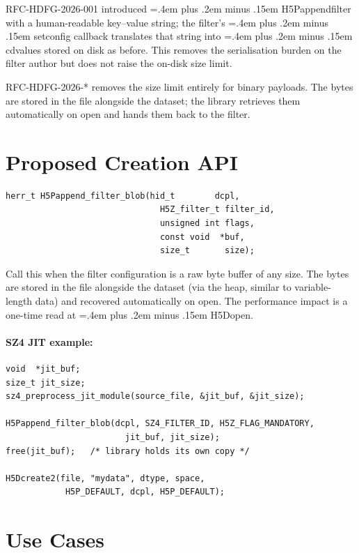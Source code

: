 \documentclass[11pt,letterpaper]{article}
\renewcommand{\texttt}[1]{\begingroup\small\ttfamily\hyphenchar\font=45
  \spaceskip=.4em plus .2em minus .15em #1\endgroup}
\renewcommand{\_}{\oldtextunderscore\allowbreak}
\begin{document}
RFC-HDFG-2026-001 introduced \texttt{H5Pappend\_filter} with a
human-readable key--value string; the filter's \texttt{set\_config} callback
translates that string into \texttt{cd\_values} stored on disk as before.
This removes the serialisation burden on the filter author but does not raise
the on-disk size limit.

RFC-HDFG-2026-* removes the size limit entirely for binary payloads.
The bytes are stored in the file alongside the dataset; the library retrieves
them automatically on open and hands them back to the filter.

\section*{Proposed Creation API}

\begin{verbatim}
herr_t H5Pappend_filter_blob(hid_t        dcpl,
                               H5Z_filter_t filter_id,
                               unsigned int flags,
                               const void  *buf,
                               size_t       size);
\end{verbatim}

Call this when the filter configuration is a raw byte buffer of any size.
The bytes are stored in the file alongside the dataset (via the heap,
similar to variable-length data) and recovered automatically on open.
The performance impact is a one-time read at \texttt{H5Dopen}.

\paragraph{SZ4 JIT example:}
\begin{verbatim}
void  *jit_buf;
size_t jit_size;
sz4_preprocess_jit_module(source_file, &jit_buf, &jit_size);

H5Pappend_filter_blob(dcpl, SZ4_FILTER_ID, H5Z_FLAG_MANDATORY,
                        jit_buf, jit_size);
free(jit_buf);   /* library holds its own copy */

H5Dcreate2(file, "mydata", dtype, space,
            H5P_DEFAULT, dcpl, H5P_DEFAULT);
\end{verbatim}

\section*{Use Cases}
\end{document}
